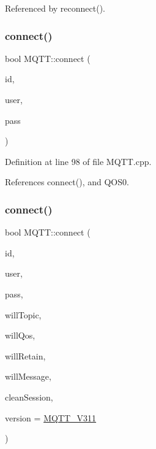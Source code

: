Referenced by reconnect().

\mbox{\label{class_m_q_t_t_a280e592fced51964607c66f7ab450b46}} 
\subsubsection{\texorpdfstring{connect()}{connect()}\hspace{0.1cm}{\footnotesize\ttfamily [2/3]}}
{\footnotesize\ttfamily bool M\+Q\+T\+T\+::connect (\begin{DoxyParamCaption}\item[{const char $\ast$}]{id,  }\item[{const char $\ast$}]{user,  }\item[{const char $\ast$}]{pass }\end{DoxyParamCaption})}



Definition at line 98 of file M\+Q\+T\+T.\+cpp.



References connect(), and Q\+O\+S0.

\mbox{\label{class_m_q_t_t_aa880316318b5bdc133c2f8c6bba1e253}} 
\subsubsection{\texorpdfstring{connect()}{connect()}\hspace{0.1cm}{\footnotesize\ttfamily [3/3]}}
{\footnotesize\ttfamily bool M\+Q\+T\+T\+::connect (\begin{DoxyParamCaption}\item[{const char $\ast$}]{id,  }\item[{const char $\ast$}]{user,  }\item[{const char $\ast$}]{pass,  }\item[{const char $\ast$}]{will\+Topic,  }\item[{\hyperlink{class_m_q_t_t_aff501e08e20ebf26b3272fcc0e7215ff}{E\+M\+Q\+T\+T\+\_\+\+Q\+OS}}]{will\+Qos,  }\item[{uint8\+\_\+t}]{will\+Retain,  }\item[{const char $\ast$}]{will\+Message,  }\item[{bool}]{clean\+Session,  }\item[{\hyperlink{class_m_q_t_t_a49430c9d6f68bbdc4e1bd039a6f5f97e}{M\+Q\+T\+T\+\_\+\+V\+E\+R\+S\+I\+ON}}]{version = {\ttfamily \hyperlink{class_m_q_t_t_a49430c9d6f68bbdc4e1bd039a6f5f97eae61f66bbb0b315cf4cb7636684c68602}{M\+Q\+T\+T\+\_\+\+V311}} }\end{DoxyParamCaption})}



